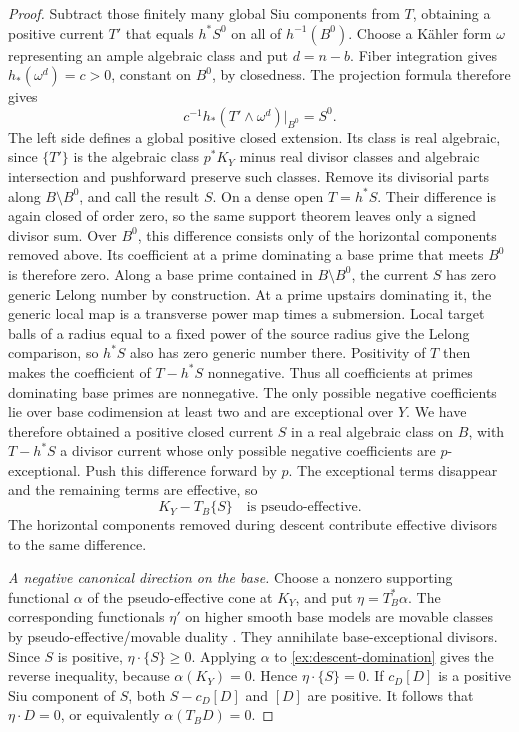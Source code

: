 \begin{proof}
Subtract those finitely many global Siu components from
\(T\), obtaining a positive current \(T'\) that equals
\(h^*S^0\) on all of \(h^{-1}(B^0)\). Choose a K\"ahler form
\(\omega\) representing an ample algebraic class and put
\(d=n-b\). Fiber integration gives
\(h_*(\omega^d)=c>0\), constant on \(B^0\), by closedness.
The projection formula therefore gives
\[
 c^{-1}h_*(T'\wedge\omega^d)|_{B^0}=S^0.
\]
The left side defines a global positive closed extension.
Its class is real algebraic, since \(\{T'\}\) is the
algebraic class \(p^*K_Y\) minus real divisor classes and
algebraic intersection and pushforward preserve such
classes. Remove its divisorial parts along
\(B\setminus B^0\), and call the result \(S\).
On a dense open \(T=h^*S\). Their difference is again closed
of order zero, so the same support theorem leaves only a
signed divisor sum. Over \(B^0\), this difference consists
only of the horizontal components removed above. Its coefficient
at a prime dominating a base prime that meets \(B^0\) is therefore
zero. Along a base prime contained in \(B\setminus B^0\),
the current \(S\) has zero generic Lelong number by construction.
At a prime upstairs dominating it, the generic local map is a
transverse power map times a submersion. Local target balls of
a radius equal to a fixed power of the source radius give the
Lelong comparison, so \(h^*S\) also has zero generic number
there. Positivity of \(T\) then makes the coefficient of
\(T-h^*S\) nonnegative. Thus all coefficients at primes
dominating base primes are nonnegative.
The only possible negative coefficients lie over base
codimension at least two and are exceptional over \(Y\).
We have therefore obtained a positive closed current \(S\) in a
real algebraic class on \(B\), with \(T-h^*S\) a divisor current
whose only possible negative coefficients are \(p\)-exceptional.
Push this difference forward by \(p\). The exceptional terms
disappear and the remaining terms are effective, so
\begin{equation}\label{ex:descent-domination}
 K_Y-T_B\{S\}\quad\text{is pseudo-effective}.
\end{equation}
The horizontal components removed during descent contribute
effective divisors to the same difference.

\smallskip
\noindent\emph{A negative canonical direction on the base.}
Choose a nonzero supporting functional \(\alpha\) of the
pseudo-effective cone at \(K_Y\), and put
\(\eta=T_B^*\alpha\). The corresponding functionals \(\eta'\)
on higher smooth base models are movable classes by
pseudo-effective/movable duality \cite[Theorem~0.2]{BDPP2013}.
They annihilate base-exceptional divisors. Since \(S\) is positive,
\(\eta\cdot\{S\}\geq0\). Applying \(\alpha\) to
\eqref{ex:descent-domination} gives the reverse inequality,
because \(\alpha(K_Y)=0\). Hence \(\eta\cdot\{S\}=0\).
If \(c_D[D]\) is a positive Siu component of \(S\), both
\(S-c_D[D]\) and \([D]\) are positive. It follows that
\(\eta\cdot D=0\), or equivalently \(\alpha(T_BD)=0\).


\end{proof}
